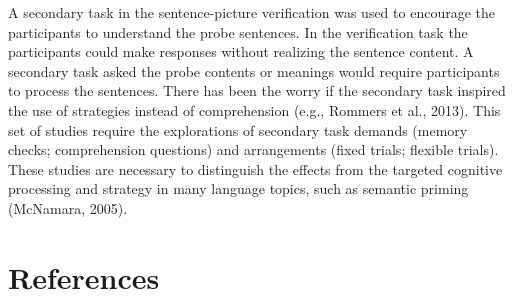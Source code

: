 \documentclass[
  man]{apa7}
\begin{document}
A secondary task in the sentence-picture verification was used to encourage the participants to understand the probe sentences. In the verification task the participants could make responses without realizing the sentence content. A secondary task asked the probe contents or meanings would require participants to process the sentences. There has been the worry if the secondary task inspired the use of strategies instead of comprehension (e.g., Rommers et al., 2013). This set of studies require the explorations of secondary task demands (memory checks; comprehension questions) and arrangements (fixed trials; flexible trials). These studies are necessary to distinguish the effects from the targeted cognitive processing and strategy in many language topics, such as semantic priming (McNamara, 2005).

\newpage

\hypertarget{references}{%
\section{References}\label{references}}

\begingroup
\setlength{\parindent}{-0.5in}
\setlength{\leftskip}{0.5in}
\end{document}
